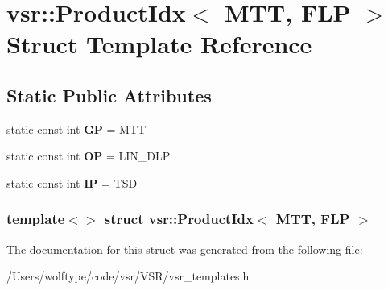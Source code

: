 \hypertarget{structvsr_1_1_product_idx_3_01_m_t_t_00_01_f_l_p_01_4}{\section{vsr\-:\-:Product\-Idx$<$ M\-T\-T, F\-L\-P $>$ Struct Template Reference}
\label{structvsr_1_1_product_idx_3_01_m_t_t_00_01_f_l_p_01_4}
}
\subsection*{Static Public Attributes}
\begin{DoxyCompactItemize}
\item 
\hypertarget{structvsr_1_1_product_idx_3_01_m_t_t_00_01_f_l_p_01_4_a16bd82bd627048bc7acb9d824c592b31}{static const int {\bfseries G\-P} = M\-T\-T}\label{structvsr_1_1_product_idx_3_01_m_t_t_00_01_f_l_p_01_4_a16bd82bd627048bc7acb9d824c592b31}

\item 
\hypertarget{structvsr_1_1_product_idx_3_01_m_t_t_00_01_f_l_p_01_4_a23d31ffc876c4a63d4bde19fd779d4b7}{static const int {\bfseries O\-P} = L\-I\-N\-\_\-\-D\-L\-P}\label{structvsr_1_1_product_idx_3_01_m_t_t_00_01_f_l_p_01_4_a23d31ffc876c4a63d4bde19fd779d4b7}

\item 
\hypertarget{structvsr_1_1_product_idx_3_01_m_t_t_00_01_f_l_p_01_4_aeb1f0708d21ae063412fc067ba0088ae}{static const int {\bfseries I\-P} = T\-S\-D}\label{structvsr_1_1_product_idx_3_01_m_t_t_00_01_f_l_p_01_4_aeb1f0708d21ae063412fc067ba0088ae}

\end{DoxyCompactItemize}
\subsubsection*{template$<$$>$ struct vsr\-::\-Product\-Idx$<$ M\-T\-T, F\-L\-P $>$}



The documentation for this struct was generated from the following file\-:\begin{DoxyCompactItemize}
\item 
/\-Users/wolftype/code/vsr/\-V\-S\-R/vsr\-\_\-templates.\-h\end{DoxyCompactItemize}
